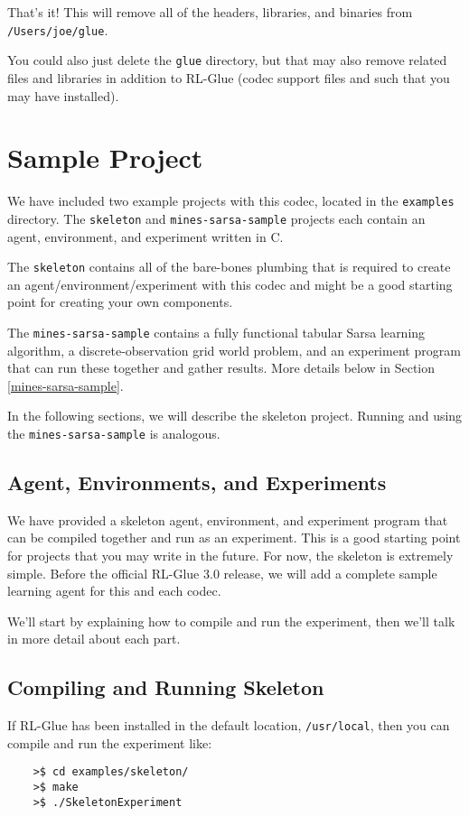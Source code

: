 \documentclass[11pt]{article}
\begin{document}
That's it!  This will remove all of the headers, libraries, and binaries from \texttt{/Users/joe/glue}.

You could also just delete the \texttt{glue} directory, but that may also remove related files and libraries in addition to RL-Glue (codec support files and such that you may have installed).



\section{Sample Project}
We have included two example projects with this codec, located in the \texttt{examples} directory.  The  \texttt{skeleton} and \texttt{mines-sarsa-sample} projects each contain an agent, environment, and experiment written in C.

The \texttt{skeleton} contains all of the bare-bones plumbing that is required to create an agent/environment/experiment with this codec and might be a good starting point for creating your own components.

The \texttt{mines-sarsa-sample} contains a fully functional tabular Sarsa learning algorithm, a discrete-observation grid world problem, and an experiment program that can run these together and gather results.  More details below in Section \ref{mines-sarsa-sample}.

In the following sections, we will describe the skeleton project.  Running and using the \texttt{mines-sarsa-sample} is analogous.


\subsection{Agent, Environments, and Experiments}
We have provided a skeleton agent, environment, and experiment program that can be compiled together and run as an experiment.
This is a good starting point for projects that you may write in the future.  For now, the skeleton is extremely simple.  Before the official RL-Glue 3.0 release, we will add a complete sample learning agent for this and each codec.

We'll start by explaining how to compile and run the experiment, then we'll talk in more detail about each part.

\subsection{Compiling and Running Skeleton}
If RL-Glue has been installed in the default location, \texttt{/usr/local}, then you can compile and run the experiment like:
\begin{verbatim}
	>$ cd examples/skeleton/
	>$ make
	>$ ./SkeletonExperiment
\end{verbatim}
\end{document}
